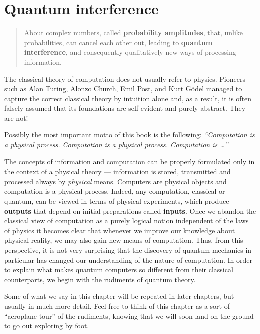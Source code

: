 \documentclass[fleqn,a4paper]{article}
\newenvironment{idea}{\everypar{\setlength{\parindent}{1.5em}}}{}
\let\oldsection\section
\renewcommand\section{\clearpage\oldsection}
\theoremstyle{definition}
\theoremstyle{definition}
\theoremstyle{definition}
\theoremstyle{definition}
\theoremstyle{remark}
\begin{document}
\hypertarget{quantum-interference}{%
\section{Quantum interference}\label{quantum-interference}}

\begin{quote}
About complex numbers, called \textbf{probability amplitudes}, that, unlike probabilities, can cancel each other out, leading to \textbf{quantum interference}, and consequently qualitatively new ways of processing information.
\end{quote}

The classical theory of computation does not usually refer to physics.
Pioneers such as Alan Turing, Alonzo Church, Emil Post, and Kurt Gödel managed to capture the correct classical theory by intuition alone and, as a result, it is often falsely assumed that its foundations are self-evident and purely abstract.
They are not!

\begin{idea}
Possibly the most important motto of this book is the following: \emph{``Computation is a physical process. Computation is a physical process. Computation is \ldots{}''}

\end{idea}

The concepts of information and computation can be properly formulated only in the context of a physical theory --- information is stored, transmitted and processed always by \emph{physical} means.
Computers are physical objects and computation is a physical process.
Indeed, any computation, classical or quantum, can be viewed in terms of physical experiments, which produce \textbf{outputs} that depend on initial preparations called \textbf{inputs}.
Once we abandon the classical view of computation as a purely logical notion independent of the laws of physics it becomes clear that whenever we improve our knowledge about physical reality, we may also gain new means of computation.
Thus, from this perspective, it is not very surprising that the discovery of quantum mechanics in particular has changed our understanding of the nature of computation.
In order to explain what makes quantum computers so different from their classical counterparts, we begin with the rudiments of quantum theory.

Some of what we say in this chapter will be repeated in later chapters, but usually in much more detail.
Feel free to think of this chapter as a sort of ``aeroplane tour'' of the rudiments, knowing that we will soon land on the ground to go out exploring by foot.
\end{document}

